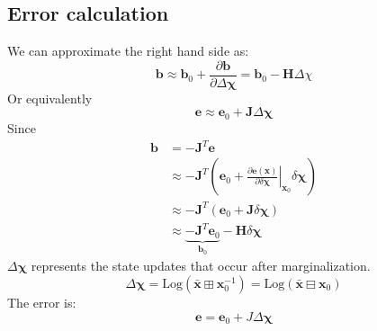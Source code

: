 \documentclass[10pt,a4paper]{article}
\numberwithin{equation}{section}
\renewcommand{\vec}[1]{\ensuremath{\mathbf{#1}}}
\newcommand{\vecs}[1]{\ensuremath{\boldsymbol{#1}}}
\newcommand{\mat}[1]{\ensuremath{\mathbf{#1}}}
\newcommand{\Log}{\mathrm{Log}}
\newcommand{\stplus}{\boxplus}
\begin{document}
\subsection{Error calculation}
We can approximate the right hand side as:
\begin{equation}
\vec{b} \approx \vec{b}_0 + \frac{\partial\vec{b}}{\partial\Delta\vecs{\chi}} = \vec{b}_0 - \mat{H}\Delta\chi
\end{equation}
Or equivalently
\begin{equation}
\vec{e} \approx \vec{e}_0 + \mat{J} \Delta \vecs{\chi}
\end{equation}
Since 
\begin{align}
\vec{b} &= -\mat{J}^T\vec{e}\\
&\approx -\mat{J}^T \left(\vec{e}_0 + \left.\frac{\partial \vec{e}(\vec{x})}{\partial \delta\vecs{\chi}}\right|_{\vec{x}_0} \delta\vecs{\chi}\right)\\
&\approx -\mat{J}^T \left(\vec{e}_0 +  \mat{J}\delta\vecs{\chi}\right)\\
&\approx \underbrace{-\mat{J}^T\vec{e}_0}_{\vec{b}_0} - \mat{H}\delta\vecs{\chi}
\end{align}
$\Delta\vecs{\chi}$ represents the state updates that occur after marginalization. 
\begin{equation}
\Delta\vecs{\chi} = \Log(\bar{\vec{x}}\stplus\vec{x}_0^{-1}) =  \Log(\bar{\vec{x}}\boxminus\vec{x}_0)
\end{equation}
The error is:
\begin{equation}
\vec{e} = \vec{e}_0 + J \Delta\vecs{\chi}
\end{equation}

\nocite{*}


\end{document}
